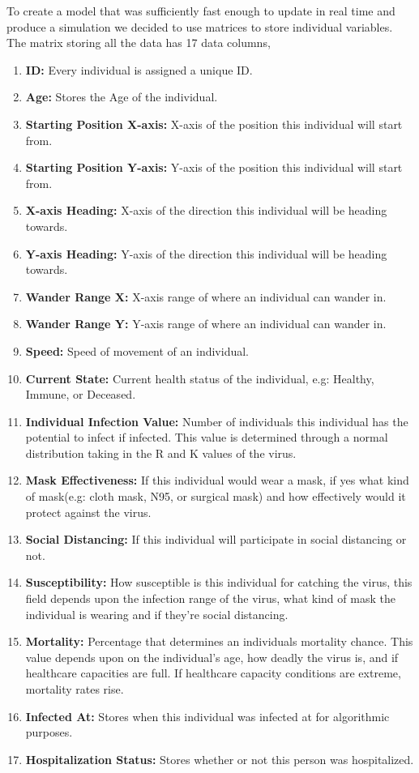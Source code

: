 \documentclass[11pt]{article}
\begin{document}
To create a model that was sufficiently fast enough to update in real time and produce a simulation we decided to use matrices to store individual variables. The matrix storing all the data has 17 data columns,
\begin{enumerate}
    \item \textbf{ID:} Every individual is assigned a unique ID.
    \item \textbf{Age:} Stores the Age of the individual.
    \item \textbf{Starting Position X-axis:} X-axis of the position this individual will start from.
    \item \textbf{Starting Position Y-axis:} Y-axis of the position this individual will start from.
    \item \textbf{X-axis Heading:} X-axis of the direction this individual will be heading towards.
    \item \textbf{Y-axis Heading:} Y-axis of the direction this individual will be heading towards.
    \item \textbf{Wander Range X:} X-axis range of where an individual can wander in.
    \item \textbf{Wander Range Y:} Y-axis range of where an individual can wander in.
    \item \textbf{Speed:} Speed of movement of an individual.
    \item \textbf{Current State:} Current health status of the individual, e.g: Healthy, Immune, or Deceased.
    \item \textbf{Individual Infection Value:} Number of individuals this individual has the potential to infect if infected. This value is determined through a normal distribution taking in the R and K values of the virus.
    \item \textbf{Mask Effectiveness:} If this individual would wear a mask, if yes what kind of mask(e.g: cloth mask, N95, or surgical mask) and how effectively would it protect against the virus.
    \item \textbf{Social Distancing:} If this individual will participate in social distancing or not.
    \item \textbf{Susceptibility:} How susceptible is this individual for catching the virus, this field depends upon the infection range of the virus, what kind of mask the individual is wearing and if they're social distancing.
    \item \textbf{Mortality:} Percentage that determines an individuals mortality chance. This value depends upon on the individual's age, how deadly the virus is, and if healthcare capacities are full. If healthcare capacity conditions are extreme, mortality rates rise.
    \item \textbf{Infected At:} Stores when this individual was infected at for algorithmic purposes.
    \item \textbf{Hospitalization Status:} Stores whether or not this person was hospitalized.
\end{enumerate}
\end{document}
